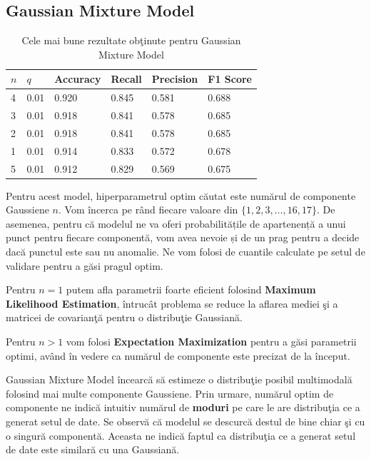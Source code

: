\subsection{Gaussian Mixture Model}

\begin{table}[H]
  \centering
  \begin{tabularx}{\textwidth}{
      |X
      |X
      |X
      |X
      |X
      |X|
  }
  \hline
  $n$ & $q$ & {Accuracy} & {Recall} & {Precision} & {F1 Score} \\
  \hline
  \rowcolor{gray!20} 4 & 0.01 & 0.920 & 0.845 & 0.581 & 0.688  \\
  3	& 0.01 & 0.918	& 0.841 & 0.578 & 0.685 \\
  \rowcolor{gray!20} 2	& 0.01 & 0.918 & 0.841 & 0.578	& 0.685  \\
  1 & 0.01 & 0.914 & 0.833 & 0.572 & 0.678 \\
  \rowcolor{gray!20} 5 & 0.01 & 0.912	& 0.829 & 0.569	& 0.675  \\
  \hline
  \end{tabularx}
  \caption{Cele mai bune rezultate obţinute pentru Gaussian Mixture Model}
\end{table}



Pentru acest model, hiperparametrul optim 
căutat este numărul de componente Gaussiene $n$. Vom încerca pe rând fiecare valoare
din $\{1, 2, 3, \ldots, 16, 17\}$. De asemenea, pentru că modelul 
ne va oferi probabilitățile de apartenență a unui punct pentru 
fiecare componentă, vom avea nevoie și de un prag pentru a decide 
dacă punctul este sau nu anomalie. Ne vom folosi de cuantile 
calculate pe setul de validare pentru a găsi pragul optim.

Pentru $n=1$ putem afla parametrii foarte eficient folosind 
\textbf{Maximum Likelihood Estimation}, întrucât problema 
se reduce la aflarea mediei şi a matricei de 
covarianţă pentru o distribuţie Gaussiană. 

Pentru $n > 1$ vom folosi \textbf{Expectation Maximization} 
pentru a găsi parametrii optimi, 
având în vedere ca numărul de componente este precizat de la început.

Gaussian Mixture Model încearcă să estimeze o distribuţie posibil multimodală 
folosind mai multe componente Gaussiene. Prin urmare, numărul optim de componente
ne indică intuitiv numărul de \textbf{moduri} pe care le are distribuţia ce a generat 
setul de date.
Se observă că modelul se descurcă destul de bine chiar şi cu o singură componentă. 
Aceasta ne indică faptul ca distribuţia ce a generat setul de date este 
similară cu una Gaussiană.

